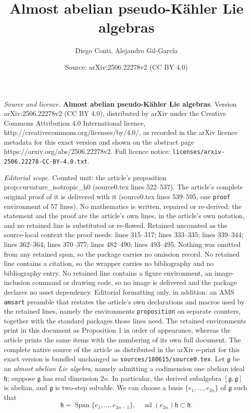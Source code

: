 \documentclass[10pt,a4paper]{amsart}
\title{\textbf{Almost abelian pseudo-Kähler Lie algebras}}
\author{Diego Conti, Alejandro Gil-Garc\'ia}
\date{Source: arXiv:2506.22278v2 (CC BY 4.0)}
\newcommand{\Span}[1]{\operatorname{Span}\{#1\}}
\DeclareMathOperator{\ad}{ad}
\newcommand{\frg}{\mathfrak{g}}
\newcommand{\frh}{\mathfrak{h}}
\newcommand{\g}{\lie g}
\newcommand{\lie}[1]{\mathfrak{#1}}
\begin{document}
\maketitle

\noindent\emph{Source and licence.} \textbf{Almost abelian pseudo-Kähler Lie algebras}. Version arXiv:2506.22278v2 (CC BY 4.0), distributed by arXiv under the Creative Commons Attribution 4.0 International licence, http://creativecommons.org/licenses/by/4.0/, as recorded in the arXiv licence metadata for this exact version and shown on the abstract page https://arxiv.org/abs/2506.22278v2. Full licence notice: \texttt{licenses/arxiv-2506.22278-CC-BY-4.0.txt}.\par\smallskip

\noindent\textit{Editorial scope.} Counted unit: the article's proposition prop:curvature\_isotropic\_h0 (source0.tex lines 522--537). The article's complete original proof of it is delivered with it (source0.tex lines 539--595, one \texttt{proof} environment of 57 lines). No mathematics is written, repaired or re-derived: the statement and the proof are the article's own lines, in the article's own notation, and no retained line is substituted or re-flowed.  Retained uncounted as the source-local context the proof needs: lines 315--317; lines 333--335; lines 339--344; lines 362--364; lines 370--377; lines 482--490; lines 493--495.  Nothing was omitted from any retained span, so the package carries no omission record.  No retained line contains a citation, so the wrapper carries no bibliography and no bibliography entry.  No retained line contains a figure environment, an image-inclusion command or drawing code, so no image is delivered and the package declares no asset dependency.  Editorial formatting only, in addition: an AMS \texttt{amsart} preamble that restates the article's own declarations and macros used by the retained lines, namely the environments \texttt{proposition} on separate counters, together with the standard packages those lines need.  The retained environments print in this document as Proposition 1 in order of appearance, whereas the article prints the same items with the numbering of its own full document.  The complete native source of the article as distributed in the arXiv e-print for this exact version is bundled unchanged as \texttt{sources/180615/source0.tex}.
Let $\g$ be an \emph{almost abelian Lie algebra}, namely admitting a codimension one abelian ideal $\frh$; suppose $\g$ has real dimension $2n$. In particular, the derived subalgebra $[\frg,\frg]$ is abelian, and $\frg$ is two-step solvable. We can choose a basis $\{e_1,\ldots,e_{2n}\}$ of $\frg$ such that \begin{equation}\label{eqn:amostabelianbasis}
    \frh=\Span{e_1,\ldots,e_{2n-1}},\quad\ad(e_{2n})\lie h\subset\lie h.
\end{equation}
\end{document}
